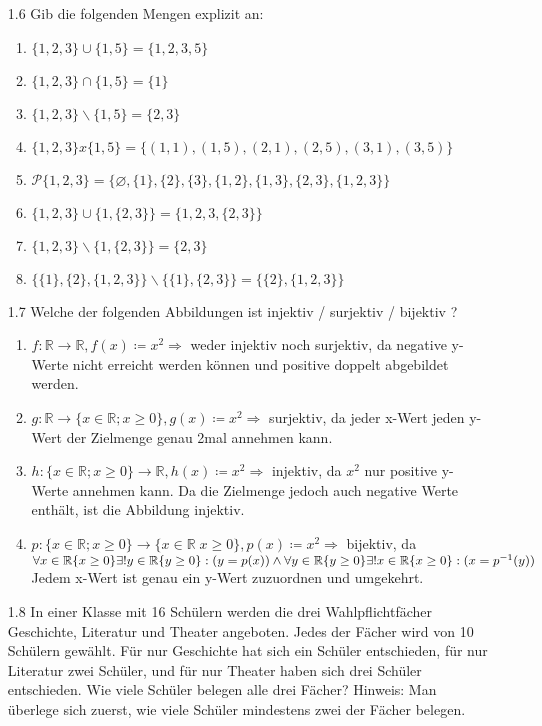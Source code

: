 \documentclass[12pt,letterpaper]{article}
\begin{document}
\begin{enumerate}
\begin{enumerate}
\end{enumerate}
\item [1.6] Gib die folgenden Mengen explizit an:
\begin{enumerate}
	\item $\{1,2,3\} \cup \{1,5\} = \{1,2,3,5\}$
	\item $\{1,2,3\} \cap \{1,5\} = \{1\}$
	\item $\{1,2,3\} \backslash \{1,5\} = \{2,3\}$
	\item $\{1,2,3\} x \{1,5\} = \{(1,1),(1,5),(2,1),(2,5),(3,1),(3,5)\}$
	\item $\mathcal{P}\{1,2,3\} = \{\varnothing,\{1\},\{2\},\{3\},\{1,2\},\{1,3\},\{2,3\},\{1,2,3\}\}$
	\item $\{1,2,3\} \cup \{1,\{2,3\}\} = \{1,2,3,\{2,3\}\}$
	\item $\{1,2,3\} \backslash \{1,\{2,3\}\} = \{2,3\}$
	\item $\{\{1\},\{2\},\{1,2,3\}\} \backslash \{\{1\},\{2,3\}\} = \{\{2\},\{1,2,3\}\}$
\end{enumerate}
\item [1.7] Welche der folgenden Abbildungen ist injektiv / surjektiv / bijektiv ?
\begin{enumerate}
 \item $f\colon\mathbb{R}\to\mathbb{R}, f(x)\coloneqq x^2\Rightarrow$ weder injektiv noch surjektiv, da negative y-Werte nicht erreicht werden können und positive doppelt abgebildet werden.
 \item $g\colon\mathbb{R}\to\{x\in\mathbb{R};x\geq 0\}, g(x)\coloneqq x^2\Rightarrow$ surjektiv, da jeder x-Wert jeden y-Wert der Zielmenge genau 2mal annehmen kann.
 \item $h:\{x\in\mathbb{R};x\geq 0\}\to\mathbb{R}, h(x)\coloneqq x^2\Rightarrow$ injektiv, da $x^2$ nur positive y-Werte annehmen kann. Da die Zielmenge jedoch auch negative Werte enthält, ist die Abbildung injektiv.
 \item $p:\{x\in\mathbb{R};x\geq 0\}\to\{x\in\mathbb{R}\;x\geq 0\}, p(x)\coloneqq x^2\Rightarrow$ bijektiv, da\\
$\forall x\in\mathbb{R}\{x\geq 0\}\exists!y\in\mathbb{R}\{y\geq 0\}:(y=p(x)) \land \\
\forall y\in\mathbb{R}\{y\geq 0\}\exists!x\in\mathbb{R}\{x\geq 0\}:(x=p^{-1}(y))$\\
Jedem x-Wert ist genau ein y-Wert zuzuordnen und umgekehrt.
\end{enumerate}
\item [1.8] In einer Klasse mit 16 Schülern werden die drei Wahlpflichtfächer Geschichte, Literatur und Theater angeboten. Jedes der Fächer wird von 10 Schülern gewählt. Für nur Geschichte hat sich ein Schüler entschieden, für nur Literatur zwei Schüler, und für nur Theater haben sich drei Schüler entschieden. Wie viele Schüler belegen alle drei Fächer?
Hinweis: Man überlege sich zuerst, wie viele Schüler mindestens zwei der Fächer belegen.\\


\end{enumerate}
\end{document}

